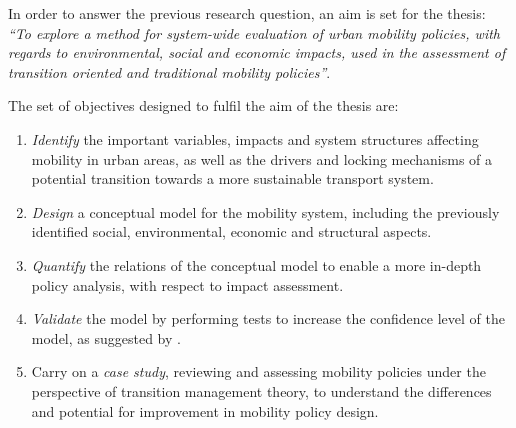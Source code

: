 \documentclass[a4paper,fontsize=10pt,bibliography=totoc]{scrartcl}
\begin{document}
\begin{multicols}{2}
In order to answer the previous research question, an aim is set for the thesis: \textit{``To explore a method for system-wide evaluation of urban mobility policies, with regards to environmental, social and economic impacts, used in the assessment of transition oriented and traditional mobility policies''}.

The set of objectives designed to fulfil the aim of the thesis are:
\begin{enumerate}[label=(\alph*)]
	\item \textit{Identify} the important variables, impacts and system structures affecting mobility in urban areas, as well as the drivers and locking mechanisms of a potential transition towards a more sustainable transport system.
	\item \textit{Design} a conceptual model for the mobility system, including the previously identified social, environmental, economic and structural aspects.
	\item \textit{Quantify} the relations of the conceptual model to enable a more in-depth policy analysis, with respect to impact assessment.
	\item \textit{Validate} the model by performing tests to increase the confidence level of the model, as suggested by \textcite{forrester1978_TestsBuildingConfidence,qudrat-ullah2010_Howdostructural}.
	\item Carry on a \textit{case study}, reviewing and assessing mobility policies under the perspective of transition management theory, to understand the differences and potential for improvement in mobility policy design.
\end{enumerate}


\end{multicols}
\end{document}
